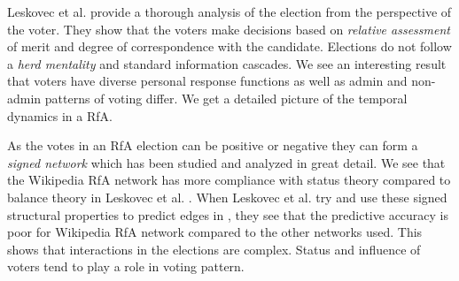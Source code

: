 Leskovec et al. provide a thorough analysis of the election from the perspective of the voter. They show that the voters make decisions based on \textit{relative assessment} of merit and degree of correspondence with the candidate. Elections do not follow a \textit{herd mentality} and standard information cascades. We see an interesting result that voters have diverse personal response functions as well as admin and non-admin patterns of voting differ. \cite{leskovec2010governance} We get a detailed picture of the temporal dynamics in a RfA.
\smallskip

As the votes in an RfA election can be positive or negative they can form a \textit{signed network} which has been studied and analyzed in great detail. We see that the Wikipedia RfA network has more compliance with status theory compared to balance theory in Leskovec et al. \cite{leskovecSigned}. When Leskovec et al. try and use these signed structural properties to predict edges in \cite{leskovecPredicting}, they see that the predictive accuracy is poor for Wikipedia RfA network compared to the other networks used. This shows that interactions in the elections are complex. Status and influence of voters tend to play a role in voting pattern.
\smallskip

